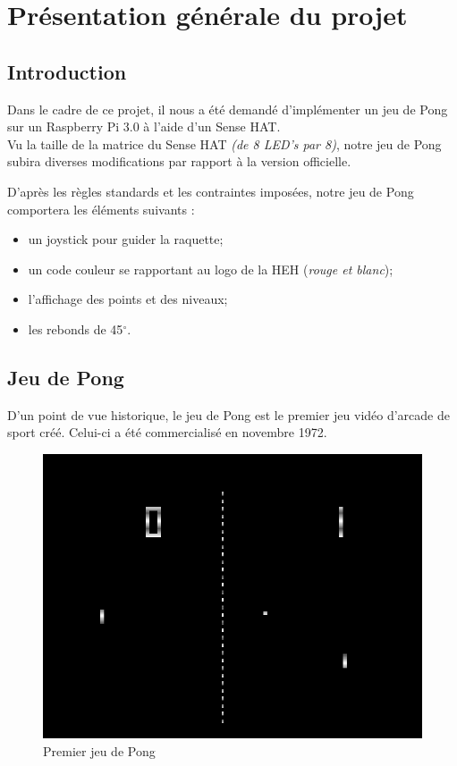 \section{Présentation générale du projet}
\label{sec:pres-gener-du}

\subsection{Introduction}
\label{sec:introduction}

Dans le cadre de ce projet, il nous a été demandé d'implémenter un jeu de Pong sur
un Raspberry Pi 3.0 à l'aide d'un Sense HAT. \\

Vu la taille de la matrice du Sense HAT \textit{(de 8 LED's par 8)}, notre jeu de Pong subira
diverses modifications par rapport à la version officielle.

D'après les règles standards et les contraintes imposées, notre jeu de
Pong comportera les éléments suivants :

\begin{itemize}
\item un joystick pour guider la raquette;
\item un code couleur se rapportant au logo de la HEH (\textit{rouge et blanc});
\item l'affichage des points et des niveaux;
\item les rebonds de 45$^{\circ}$.
\end{itemize}

\subsection{Jeu de Pong}
\label{sec:jeu-de-pong}

D'un point de vue historique, le jeu de Pong est le premier jeu vidéo d'arcade
de sport créé. Celui-ci a été commercialisé en novembre 1972.

\begin{figure}[h]
  \centering
  \includegraphics[scale=0.3]
  {textures/images/presentation/pong.png}
  \caption{Premier jeu de Pong}
  \label{fig:pong}
\end{figure}

